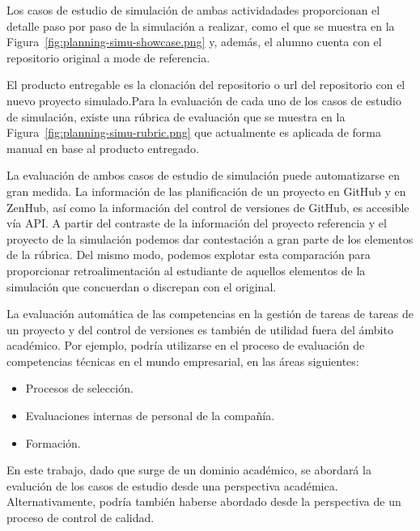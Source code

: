 Los casos de estudio de simulación de ambas actividadades proporcionan el  detalle paso por paso de la simulación a realizar, como el que se muestra en la Figura~\ref{fig:planning-simu-showcase.png} y, además, el alumno cuenta con el repositorio original a mode de referencia. 


El producto entregable es la clonación del repositorio o url del repositorio con el nuevo proyecto simulado.Para la evaluación de cada uno de los casos de estudio de simulación, existe una rúbrica de evaluación que se muestra en la  Figura~\ref{fig:planning-simu-rubric.png} que actualmente es aplicada de forma manual en base al producto entregado.


La evaluación de ambos casos de estudio de simulación puede automatizarse en gran medida. La información de las planificación de un proyecto en GitHub y en ZenHub, así como la información  del control de versiones de GitHub, es accesible vía API. A partir del contraste de la información del proyecto referencia y el proyecto de la simulación podemos dar contestación a gran parte de los elementos de la rúbrica. Del mismo modo, podemos explotar esta comparación para proporcionar retroalimentación al estudiante de aquellos elementos de la simulación que concuerdan o discrepan con el original.

La evaluación  automática de las competencias en la  gestión de tareas de tareas de un proyecto y del control de versiones es también de  utilidad fuera del ámbito académico. Por ejemplo, podría utilizarse en el proceso de evaluación de competencias técnicas en el mundo empresarial, en las áreas siguientes:

\begin{itemize}
	\item Procesos de selección.
	\item Evaluaciones internas de personal de la compañía.
	\item Formación.
\end{itemize}

En este trabajo, dado que surge de un dominio académico, se abordará la evalución de los casos de estudio desde una perspectiva académica.  Alternativamente, podría también haberse abordado desde la perspectiva de un proceso de control de calidad.
